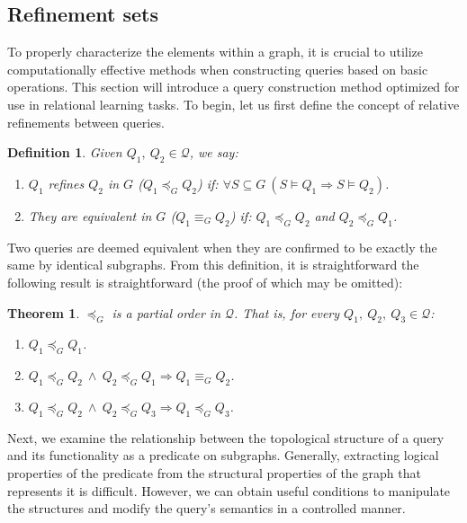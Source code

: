 \documentclass[mathematics,article,submit,pdftex,moreauthors]{Definitions/mdpi}
\newtheorem{definition}{Definition}[section]
\newtheorem{theorem}{Theorem}
\begin{document}
\subsection{Refinement sets}    
\label{refs}

To properly characterize the elements within a graph, it is crucial to utilize computationally effective methods when constructing queries based on basic operations. This section will introduce a query construction method optimized for use in relational learning tasks. To begin, let us first define the concept of relative refinements between queries.

\begin{definition}{}
    Given $Q_1,\ Q_2\in \mathcal{Q}$, we say:
    \begin{enumerate}
    	\item $Q_1$ \emph{refines} $Q_2$ in $G$ ($Q_1\preceq_G Q_2$) if:
    	$\forall S\subseteq G\ (S\vDash Q_1 \Rightarrow S\vDash Q_2)$.
    	\item They are \emph{equivalent} in $G$ ($Q_1\equiv_G Q_2$) if:
    	$Q_1\preceq_G Q_2$ and $Q_2\preceq_G Q_1$.
    \end{enumerate} 
\end{definition}\medskip

Two queries are deemed equivalent when they are confirmed to be exactly the same by identical subgraphs. From this definition, it is straightforward the following result is straightforward (the proof of which may be omitted):

\begin{theorem}{}
    $\preceq_G$ is a partial order in $\mathcal{Q}$. That is, for every $Q_1,\ Q_2,\ Q_3 \in \mathcal{Q}$:
    \begin{enumerate}
        \item $Q_1\preceq_G Q_1$.
        \item $Q_1\preceq_G Q_2\ \wedge \ Q_2\preceq_G Q_1 \Rightarrow Q_1\equiv_G Q_2$.
        \item $Q_1\preceq_G Q_2\ \wedge \ Q_2\preceq_G Q_3 \Rightarrow Q_1\preceq_G Q_3$.
    \end{enumerate}
\end{theorem}\medskip

Next, we examine the relationship between the topological structure of a query and its functionality as a predicate on subgraphs. Generally, extracting logical properties of the predicate from the structural properties of the graph that represents it is difficult. However, we can obtain useful conditions to manipulate the structures and modify the query's semantics in a controlled manner.
\end{document}
